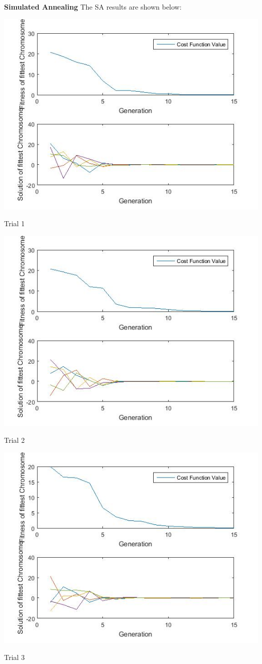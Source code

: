 \documentclass{article}
\begin{document}
\textbf{Simulated Annealing} The SA results are shown below:\\
\centerline{\includegraphics[width=0.5\linewidth]{sa_tf5_a}}
\centerline{Trial 1}
\centerline{\includegraphics[width=0.5\linewidth]{sa_tf5_b}}
\centerline{Trial 2}
\centerline{\includegraphics[width=0.5\linewidth]{sa_tf5_c}}
\centerline{Trial 3}
\end{document}
